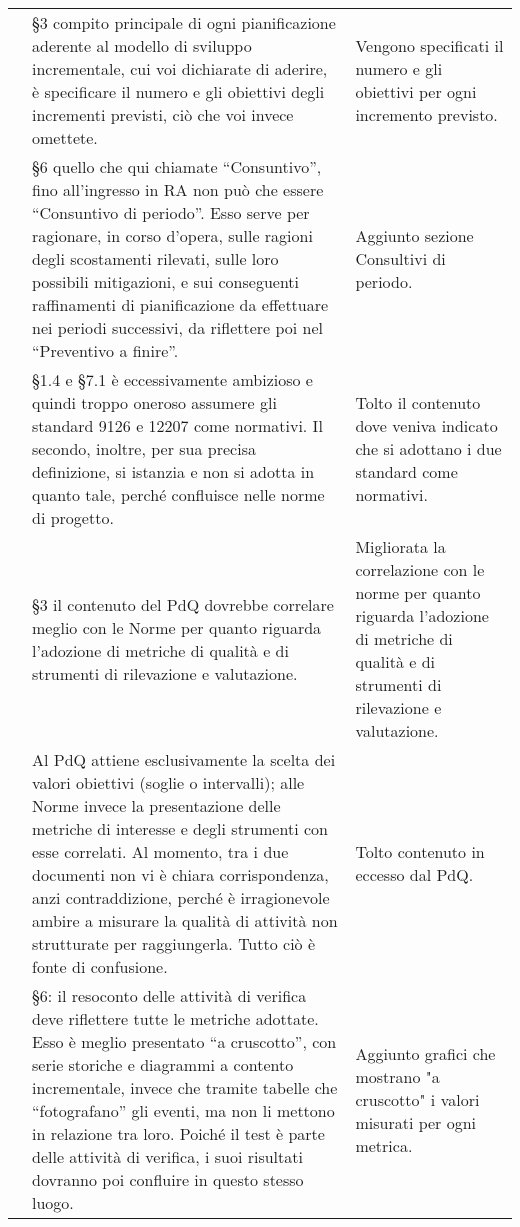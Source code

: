 {\begin{longtable}{ C{2.2cm} C{6cm} C{6cm}}
		\PdP & §3 compito principale di ogni pianificazione aderente al modello di sviluppo incrementale, cui voi dichiarate di aderire, è specificare il numero e gli obiettivi degli incrementi previsti, ciò che voi invece omettete. & Vengono specificati il numero e gli obiettivi per ogni incremento previsto.\\
		
		\PdP & §6 quello che qui chiamate “Consuntivo”, fino all’ingresso in RA non può che essere “Consuntivo di periodo”. Esso serve per ragionare, in corso d’opera, sulle ragioni degli scostamenti rilevati, sulle loro possibili mitigazioni, e sui conseguenti raffinamenti di pianificazione da effettuare nei periodi successivi, da riflettere poi nel “Preventivo a finire”. & Aggiunto sezione Consultivi di periodo.\\
		
		\PdQ & §1.4 e §7.1 è eccessivamente ambizioso e quindi troppo oneroso assumere gli standard 9126 e 12207 come normativi. Il secondo, inoltre, per sua precisa definizione, si istanzia e non si adotta in quanto tale, perché confluisce nelle norme di progetto.  & Tolto il contenuto dove veniva indicato che si adottano i due standard come normativi. \\
		
		\PdQ & §3 il contenuto del PdQ dovrebbe correlare meglio con le
		Norme per quanto riguarda l’adozione di metriche di qualità e di strumenti di
		rilevazione e valutazione. & Migliorata la correlazione con le norme per quanto riguarda l'adozione di metriche di qualità e di strumenti di
		rilevazione e valutazione.\\
		
		\PdQ & Al PdQ attiene esclusivamente la scelta dei valori obiettivi (soglie o intervalli); alle Norme invece la presentazione delle metriche di interesse e degli strumenti con esse correlati. Al momento, tra i due documenti non vi è chiara corrispondenza, anzi contraddizione, perché è irragionevole ambire a misurare la qualità di attività non strutturate per raggiungerla. Tutto ciò è fonte di confusione. & Tolto contenuto in eccesso dal PdQ.\\
		
		\PdQ & §6: il resoconto delle attività di verifica deve riflettere tutte le metriche adottate. Esso è meglio presentato “a cruscotto”, con serie storiche e diagrammi a contento incrementale, invece che tramite tabelle che “fotografano” gli eventi, ma non li mettono in relazione tra loro. Poiché il test è parte delle attività di verifica, i suoi risultati dovranno poi confluire in questo stesso luogo. & Aggiunto grafici che mostrano "a cruscotto" i valori misurati per ogni metrica.\\
		\hline
		

\end{longtable}}
